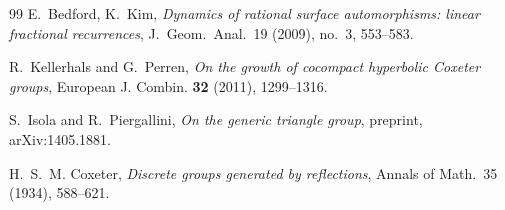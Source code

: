 \documentclass[11pt,a4paper]{article}
\theoremstyle{remark}
\theoremstyle{plain}
\begin{document}
\begin{thebibliography}{99}
E.~Bedford, K.~Kim, \emph{Dynamics of rational surface automorphisms:
linear fractional recurrences}, J.\ Geom.\ Anal.\ 19 (2009), no.~3,
553--583.

R.~Kellerhals and G.~Perren,
\emph{On the growth of cocompact hyperbolic Coxeter groups},
European J. Combin. \textbf{32} (2011), 1299--1316.

S.~Isola and R.~Piergallini,
\emph{On the generic triangle group},
preprint, arXiv:1405.1881.

H.~S.~M. Coxeter, \emph{Discrete groups generated by reflections},
Annals of Math.\ 35 (1934), 588--621.

\end{thebibliography}
\end{document}
